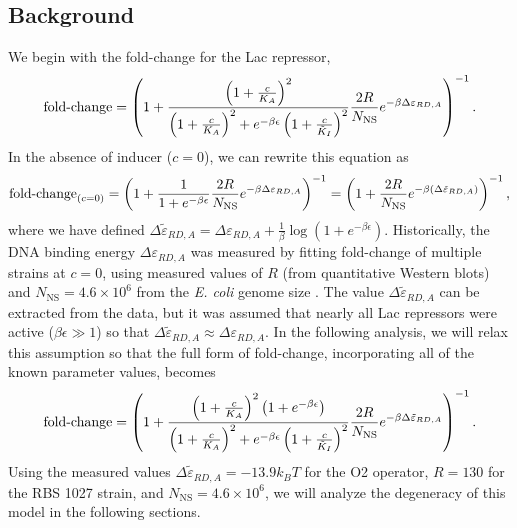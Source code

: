 \subsection{Background}


We begin with the fold-change for the Lac repressor,
\begin{equation}
\operatorname{fold-change}= \left(
1+\frac{\left(1+\frac{c}{K_A}\right)^2}{\left(1+\frac{c}{K_A}\right)^2+e^{-\beta \epsilon}\left(1 + \frac{c}{\tilde{K}_I}\right)^2}\frac{2 R}{N_{\text{NS}}}e^{-\beta \Delta\varepsilon_{RD,A}} \right)^{-1}.
\end{equation}
In the absence of inducer ($c = 0$), we can rewrite this equation as
\begin{equation}
\operatorname{fold-change}_{(c=0)}= \left(
1+\frac{1}{1+e^{-\beta \epsilon}}\frac{2 R}{N_{\text{NS}}}e^{-\beta \Delta\varepsilon_{RD,A}} \right)^{-1} = \left(
1+\frac{2 R}{N_{\text{NS}}}e^{-\beta \left( \Delta\tilde{\varepsilon}_{RD,A} \right) } \right)^{-1},
\end{equation}
where we have defined $\Delta\tilde{\varepsilon}_{RD,A} = \Delta\varepsilon_{RD,A} + \frac{1}{\beta} \log \left( 1 + e^{-\beta \epsilon} \right) $. Historically, the DNA binding energy $\Delta\varepsilon_{RD,A}$ was measured by fitting fold-change of multiple strains at $c = 0$, using measured values of $R$ (from quantitative Western blots) and $N_{\text{NS}} = 4.6
\times 10^6$ from the \textit{E. coli} genome size \cite{Garcia2011}. The value $\Delta\tilde{\varepsilon}_{RD,A}$ can be extracted from the data, but it was assumed that nearly all Lac repressors were active ($\beta \epsilon \gg 1$) so that $\Delta\tilde{\varepsilon}_{RD,A} \approx \Delta\varepsilon_{RD,A}$. In the following analysis, we will relax this assumption so that the full form of fold-change, incorporating all of the known parameter values, becomes
\begin{equation} \label{SIFullFoldChangeExpression}
\operatorname{fold-change}= \left(
1+\frac{\left(1+\frac{c}{K_A}\right)^2 \left( 1 + e^{-\beta \epsilon} \right)}{\left(1+\frac{c}{K_A}\right)^2+e^{-\beta \epsilon}\left(1 + \frac{c}{\tilde{K}_I}\right)^2}\frac{2 R}{N_{\text{NS}}}e^{-\beta \Delta\tilde{\varepsilon}_{RD,A}} \right)^{-1}.
\end{equation}
Using the measured values $\Delta\tilde{\varepsilon}_{RD,A} = -13.9 k_B T$ for
the O2 operator, $R=130$ for the RBS 1027 strain, and $N_{\text{NS}} = 4.6
\times 10^6$, we will analyze the degeneracy of this model in the following
sections.

